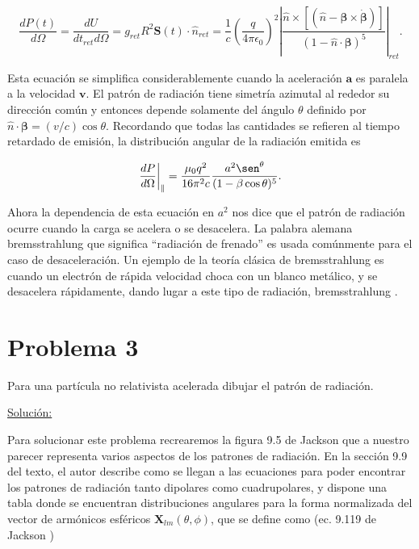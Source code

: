 \documentclass[a4paper,11pt]{article}
\numberwithin{equation}{section}
\newcommand{\zerodel}{.\kern-\nulldelimiterspace}
\begin{document}
\begin{equation}
 \frac{dP(t)}{d\Omega} = \frac{dU}{dt_{ret}d\Omega} = g_{ret} R^2 \mathbf{S}(t) 
 \cdot \hat{n}_{ret} = \frac{1}{c}\left(\frac{q}{4\pi\epsilon_0}\right)^2 
 \left|\frac{\hat{n} \times [(\hat{n} - 
 \pmb{\beta} \times \dot{\pmb{\beta}})]}{(1 - \hat{n}\cdot \pmb{\beta})^5}\right|_{ret}.
\end{equation}

Esta ecuación se simplifica considerablemente cuando la aceleración $\mathbf{a}$ es 
paralela a la velocidad $\mathbf{v}$. El patrón de radiación tiene simetría 
azimutal al rededor su dirección común y entonces depende solamente del 
ángulo $\theta$ definido por $\hat{n} \cdot \pmb{\beta} = (v/c)\cos{\theta}$. 
Recordando que todas las cantidades se refieren al tiempo retardado de 
emisión, la distribución angular de la radiación emitida es 

\begin{equation}
 \left\zerodel \frac{dP}{d\Omega}\right|_{\parallel} = \frac{\mu_0q^2}{16\pi^2c} 
 \frac{a^2\sen^{\theta}}{(1 - \beta\cos{\theta})^5}.
\end{equation}

Ahora la dependencia de esta ecuación en $a^2$ nos dice que el patrón de radiación 
ocurre cuando la carga se acelera o se desacelera. La palabra alemana bremsstrahlung 
que significa ``radiación de frenado'' es usada comúnmente para el caso de desaceleración. 
Un ejemplo de la teoría clásica de bremsstrahlung es cuando un electrón de rápida 
velocidad choca con un blanco metálico, y se desacelera rápidamente, dando lugar a 
este tipo de radiación, bremsstrahlung \cite{griffiths}.

\section{Problema 3}

Para una partícula no relativista acelerada dibujar el patrón de radiación.

\vspace{.3cm} \underline{Solución:} \vspace{.3cm}

Para solucionar este problema recrearemos la figura 9.5 de Jackson \cite{jackson} que 
a nuestro parecer representa varios aspectos de los patrones de radiación. En la 
sección 9.9 del texto, el autor describe como se llegan a las ecuaciones para 
poder encontrar los patrones de radiación tanto dipolares como cuadrupolares, 
y dispone una tabla donde se encuentran distribuciones angulares para la forma 
normalizada del vector de armónicos esféricos $\mathbf{X}_{lm}(\theta,\phi)$, que 
se define como (ec. 9.119 de Jackson \cite{jackson})
\end{document}
